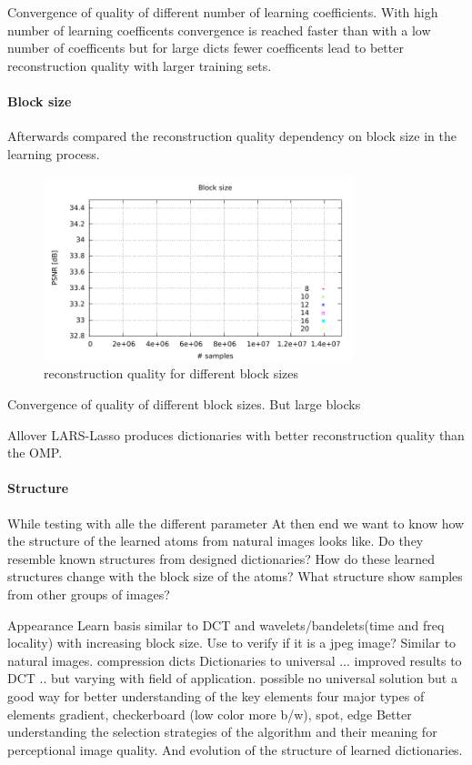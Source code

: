 Convergence of quality of different number of learning coefficients.
With high number of learning coefficents convergence is reached faster than
with a low number of coefficents but for large dicts fewer coefficents lead to
better reconstruction quality with larger training sets.

\paragraph{Block size}
Afterwards compared the reconstruction quality dependency on block size in the
learning process.

\begin{figure}[h]
\centering
\includegraphics[width =
0.8\textwidth]{../tests/results/blockSizeConverg.pdf}
\caption{reconstruction quality for different block sizes}
\label{fig:dict size}
\end{figure}

Convergence of quality of different block sizes.
But large blocks 

Allover LARS-Lasso produces dictionaries with better reconstruction quality
than the OMP. 

\paragraph{Structure}
While testing with alle the different parameter
At then end we want to know how the structure of the learned atoms from natural
images looks like. Do they resemble known structures from designed dictionaries?
How do these learned structures change with the block size of the atoms?
What structure show samples from other groups of images?

Appearance 
Learn basis similar to DCT and wavelets/bandelets(time and freq locality) with
increasing block size. Use to verify if it is a jpeg image?
Similar to natural images.
compression dicts
Dictionaries to universal ... improved results to DCT .. but varying with field
of application. possible no universal solution but a good way for better
understanding of the key elements
  four major types of elements
  gradient, checkerboard (low color more b/w), spot, edge
Better understanding the selection strategies of the algorithm and their
meaning for perceptional image quality. And evolution of the structure of
learned dictionaries. 

